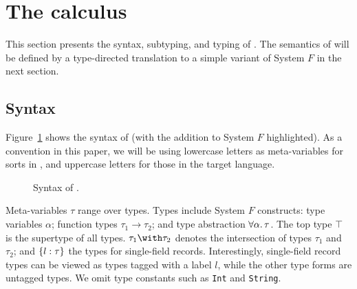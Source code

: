 \section{The \name calculus} \label{sec:fi}

This section presents the syntax, subtyping, and typing of \name.  The
semantics of \name will be defined by a type-directed translation
to a simple variant of System $F$ in the next section.

\subsection{Syntax}

Figure~\ref{fig:fi-syntax} shows the syntax of \name (with the addition to
System $F$ highlighted). As a convention in this paper, we will be using
lowercase letters as meta-variables for sorts in \name, and uppercase letters
for those in the target language.


\begin{figure}[h]
  
  \caption{Syntax of \name.}
  \label{fig:fi-syntax}
\end{figure}


Meta-variables $\tau$ range over types. Types include System $F$ constructs:
type variables $\alpha$; function types $\tau_1 \to \tau_2$; and type
abstraction $ \forall \alpha. \, \tau $. The top type $\top$ is the supertype of all
types. $\tau_1 \andOp \tau_2$ denotes
the intersection of types $\tau_1$ and $\tau_2$; and $\{ l : \tau \}$ the types
for single-field records. Interestingly, single-field record types can be viewed as types
tagged with a label $l$, while the other type forms are untagged types. We omit
type constants such as \lstinline$Int$ and \lstinline$String$.

